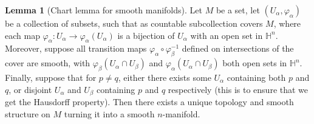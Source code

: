 \documentclass[aps,pra,showpacs,notitlepage,onecolumn,superscriptaddress,nofootinbib]{revtex4-1}
\theoremstyle{definition}
\newtheorem{lemma}{Lemma}[section]
\begin{document}
\begin{lemma}[Chart lemma for smooth manifolds]
  Let $M$ be a set, let $(U_{\alpha}, \varphi_{\alpha})$ be a collection of subsets, such that as countable subcollection covers $M$, where each map $\varphi_{\alpha} : U_{\alpha} \rightarrow \varphi_{\alpha}(U_{\alpha})$ is a bijection
  of $U_{\alpha}$ with an open set in $\mathbb{H}^n$. Moreover, suppose all transition maps $\varphi_{\alpha} \circ \varphi_{\beta}^{-1}$ defined on intersections of the cover are smooth, with $\varphi_{\beta}(U_{\alpha} \cap U_{\beta})$
  and $\varphi_{\alpha}(U_{\alpha} \cap U_{\beta})$ both open sets in $\mathbb{H}^n$. Finally, suppose that for $p \neq q$, either there exists
  some $U_{\alpha}$ containing both $p$ and $q$, or disjoint $U_{\alpha}$ and $U_{\beta}$ containing $p$ and $q$
  respectively (this is to ensure that we get the Hausdorff property). Then there exists a unique topology and smooth structure on $M$ turning it into a smooth $n$-manifold.
  \end{lemma}
\end{document}
